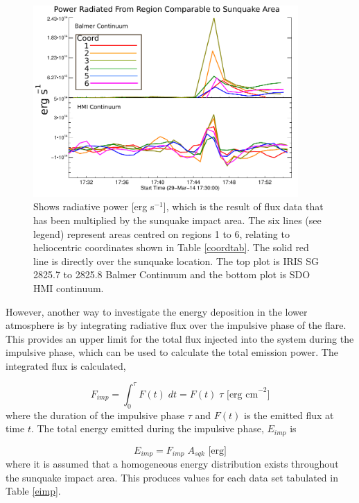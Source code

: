 \begin{figure}[H]
  \begin{center}
  \includegraphics[width=0.9\textwidth]{29-Mar-14-A_sqk-Power-Ladder-Balm-HMI-Only}
  \end{center}
  \caption{Shows radiative power [erg s$^{-1}$], which is the result of flux data that has been multiplied by the sunquake impact area. The six lines (see legend) represent areas centred on regions 1 to 6, relating to heliocentric coordinates shown in Table \ref{coordtab}. The solid red line is directly over the sunquake location. The top plot is IRIS SG  2825.7 to 2825.8 Balmer Continuum and the bottom plot is SDO HMI continuum.}\label{powerladder-balm-hmi-only}
\end{figure}

\noindent
However, another way to investigate the energy deposition in the lower atmosphere is by integrating radiative flux over the impulsive phase of the flare. This provides an upper limit for the total flux injected into the system during the impulsive phase, which can be used to calculate the total emission power. The integrated flux is calculated,

\begin{equation}
F_{imp} = \int_{0}^{\tau} F(t) \; dt = F(t) \; \tau \text{ [erg cm}^{-2}]
\end{equation}\label{f-imp}
\noindent
where the duration of the impulsive phase $\tau$ and $F(t)$ is the emitted flux at time $t$. The total energy emitted during the impulsive phase, $E_{imp}$ is

\begin{equation}
E_{imp}=F_{imp} \; A_{sqk} \text{ [erg}]
\end{equation}\label{e-imp}
\noindent
where it is assumed that a homogeneous energy distribution exists throughout the sunquake impact area. This produces values for each data set tabulated in Table \ref{eimp}. 


